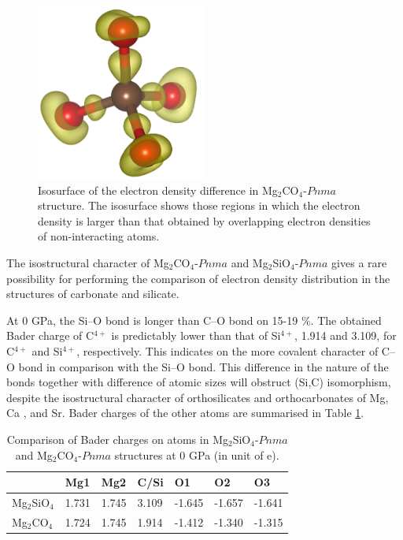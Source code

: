\documentclass[a4paperm]{article}
\begin{document}
\begin{figure}[H]
	\includegraphics[width=0.5\textwidth]{dens_diff.png} \centering
	\caption{Isosurface of the electron density difference in Mg$_2$CO$_4$-$Pnma$ structure. The isosurface shows those regions in which the electron density is larger than that obtained by overlapping electron densities of non-interacting atoms.} \label{diff}
\end{figure}

The isostructural character of Mg$_2$CO$_4$-$Pnma$ and Mg$_2$SiO$_4$-$Pnma$ gives a rare possibility for performing the comparison of electron density distribution in the structures of carbonate and silicate.

At 0 GPa, the Si--O bond is longer than C--O bond on 15-19 \%.
The obtained Bader charge of C$^{4+}$ is predictably lower than that of Si$^{4+}$, 1.914 and 3.109, for C$^{4+}$ and Si$^{4+}$, respectively. 
This indicates on the more covalent character of C--O bond in comparison with the Si--O bond.
This difference in the nature of the bonds together with difference of atomic sizes will obstruct (Si,C) isomorphism, despite the isostructural character of orthosilicates and orthocarbonates of Mg, Ca \cite{sagatova2020_ortho}, and Sr\cite{laniel2021_sr2co4}.
Bader charges of the other atoms are summarised in Table \ref{t:bader}.

\begin{table}[h] \centering
	\caption{Comparison of Bader charges on atoms in Mg$_2$SiO$_4$-$Pnma$ and Mg$_2$CO$_4$-$Pnma$ structures at 0 GPa (in unit of e).} \vspace{2mm} \label{t:bader}
	\begin{tabular}{l l l l l l l }
        &       Mg1     &       Mg2     &       C/Si    &       O1      &       O2      &       O3      \\
		\hline
Mg$_2$SiO$_4$ &       1.731   &       1.745   &       3.109   &       -1.645  &       -1.657  &       -1.641  \\
Mg$_2$CO$_4$  &       1.724   &       1.745   &       1.914   &       -1.412  &       -1.340  &       -1.315  \\
		\hline 


	\end{tabular}
\end{table}
\end{document}
